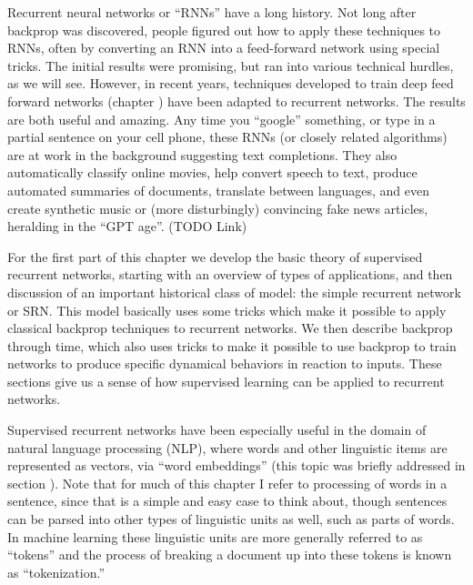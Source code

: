 Recurrent neural networks or ``RNNs'' have a long history. Not long after backprop was discovered, people figured out how to apply these techniques to RNNs, often by converting an RNN into a feed-forward network using special tricks. The initial results were promising, but ran into various technical hurdles, as we will see. However, in recent years, techniques developed to train deep feed forward networks (chapter ) have been adapted to recurrent networks. The results are both useful and amazing. Any time you ``google'' something, or type in a partial sentence on your cell phone, these RNNs (or closely related algorithms) are at work in the background suggesting text completions. They also automatically classify online movies, help convert speech to text, produce automated summaries of documents, translate between languages, and even create synthetic music or (more disturbingly) convincing fake news articles, heralding in the ``GPT age''. (TODO Link)

For the first part of this chapter we develop the basic theory of supervised recurrent networks, starting with an overview of types of applications, and then discussion of an important historical class of model: the simple recurrent network or SRN. This model basically uses some tricks which make it possible to apply classical backprop techniques to recurrent networks. We then describe backprop through time, which also uses tricks to make it possible to use backprop to train networks to produce specific dynamical behaviors in reaction to inputs. These sections give us a sense of how supervised learning can be applied to recurrent networks. 

Supervised recurrent networks have been especially useful in the domain of natural language processing (NLP), where words and other linguistic items are represented as vectors, via ``word embeddings'' (this topic was briefly addressed in section ).  Note that  for much of this chapter I refer to processing of words in a sentence, since that is a simple and easy case to think about, though sentences can be parsed into other types of linguistic units as well, such as parts of words. In machine learning these linguistic units are more generally referred to as ``tokens'' and the process of breaking a document up into these tokens is known as ``tokenization.''
	
